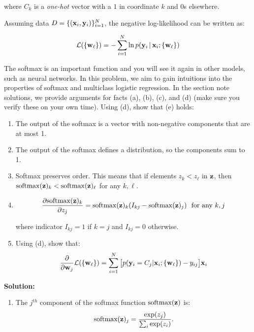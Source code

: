 \documentclass[12pt,letterpaper]{article}
\begin{document}
\begin{enumerate}
{{\noindent where $C_k$ is a \textit{one-hot} vector with a $1$ in coordinate $k$ and $0$s elsewhere.

  Assuming data $D = \{(\mathbf{x}_i, \mathbf{y}_i)\}_{i=1}^N$,
  the negative log-likelihood can be written as:

  \[\mathcal{L}(\{\mathbf{w}_{\ell}\}) = - \sum_{i=1}^N \ln p(\mathbf{y}_i \,|\, \mathbf{x}_i; \{\mathbf{w}_{\ell}\}) \]

  The softmax is an important function and you will see it again in other models, such as neural networks.
  In this problem, we aim to gain intuitions into the properties of
  softmax and multiclass logistic regression. In the section note solutions,
  we provide arguments for facts (a), (b), (c), and (d) (make sure you verify
  these on your own time). Using (d), show that (e) holds:\\

  \begin{enumerate}
      \item The output of the softmax is a vector with non-negative components
      that are at most 1. 

      \item The output of the softmax defines a distribution, so the components sum to 1.

      \item Softmax preserves order. This means that if elements $z_k < z_\ell$
    in $\mathbf{z}$, then  $\mathrm{softmax}(\mathbf{z})_k < \mathrm{softmax}(\mathbf{z})_{\ell}$ for any $k,\ell$. 
      \item \[\frac{\partial \mathrm{softmax}(\mathbf{z})_k }{\partial z_j} = \mathrm{softmax}(\mathbf{z})_k (I_{kj} - \mathrm{softmax}(\mathbf{z})_j) \ \ \text{for\ any\ } k, j  \]

    where indicator $I_{kj}=1$ if $k=j$ and $I_{kj}=0$ otherwise.

    \item Using (d), show that:
       \[ \frac{\partial }{\partial \mathbf{w}_j} \mathcal{L}(\{\mathbf{w}_{\ell}\}) = \sum_{i=1}^N 
       \big[p(\mathbf{y}_i = C_j | \mathbf{x}_i; \{\mathbf{w}_\ell\}) - y_{ij} \big] \mathbf{x}_i  \]
    
  \end{enumerate}
}}

  \newpage

  \textbf{Solution:}

        \begin{enumerate}
            
            \item  The $j^{th}$ component of the softmax function $\text{softmax}({\bf z})$ is:
            \[\text{softmax}({\bf z})_j = \frac{\exp(z_j)}{\sum_i \exp(z_i)}.\]
            

\end{enumerate}
\end{enumerate}
\end{document}
